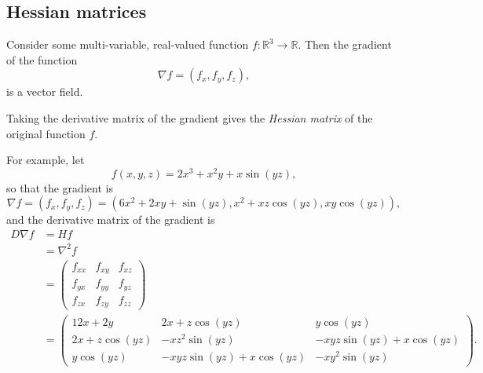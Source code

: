 \documentclass[11pt]{article}
\begin{document}


\subsection*{Hessian matrices}

Consider some multi-variable, real-valued function \(f \colon \mathbb R^3 \to \mathbb R\). Then the gradient of the function
\[
    \nabla f = (f_x, f_y, f_z),
\]
is a vector field.

Taking the derivative matrix of the gradient gives the \emph{Hessian matrix} of the original function \(f\).

For example, let
\[
    f(x, y, z) = 2x^3 + x^2 y + x \sin (yz),
\]
so that the gradient is
\[
    \nabla f = (f_x, f_y, f_z) = (6 x^2 + 2x y + \sin (yz), x^2 + xz \cos (yz), xy \cos (yz)),
\]
and the derivative matrix of the gradient is
\begin{align*}
    D \nabla f &= H f \\
        &= \nabla ^2 f \\
    &=
     \begin{pmatrix}
        f_{xx} & f_{xy} & f_{xz} \\
        f_{yx} & f_{yy} & f_{yz} \\
        f_{zx} & f_{zy} & f_{zz}
    \end{pmatrix} \\
    &=
    \begin{pmatrix}
        12x + 2y & 2x + z \cos (yz) & y \cos (yz) \\
        2x + z \cos (yz) & -xz^2 \sin (yz) & -xyz \sin (yz) + x \cos (yz) \\
        y \cos (yz) & -xyz \sin (yz) + x \cos (yz) & -xy^2 \sin (yz)
    \end{pmatrix}.
\end{align*}
\end{document}
